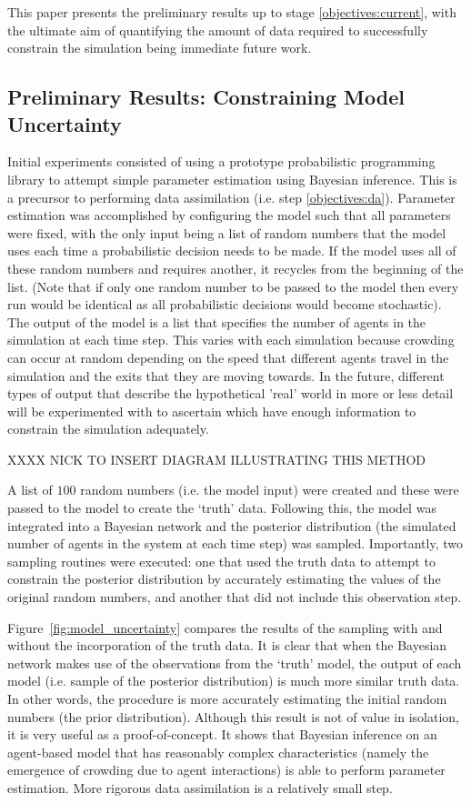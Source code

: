 \documentclass[runningheads]{llncs}
\begin{document}
This paper presents the preliminary results up to stage \ref{objectives:current}, with the ultimate aim of quantifying the amount of data required to successfully constrain the simulation being immediate future work. 


\subsection{Preliminary Results: Constraining Model Uncertainty}

Initial experiments consisted of using a prototype probabilistic programming library to attempt simple parameter estimation using Bayesian inference. This is a precursor to performing data assimilation (i.e. step \ref{objectives:da}). Parameter estimation was accomplished by configuring the model such that all parameters were fixed, with the only input being a list of random numbers that the model uses each time a probabilistic decision needs to be made. If the model uses all of these random numbers and requires another, it recycles from the beginning of the list. (Note that if only one random number to be passed to the model then every run would be identical as all probabilistic decisions would become stochastic). The output of the model is a list that specifies the number of agents in the simulation at each time step. This varies with each simulation because crowding can occur at random depending on the speed that different agents travel in the simulation and the exits that they are moving towards. In the future, different types of output that describe the hypothetical 'real' world in more or less detail will be experimented with to ascertain which have enough information to constrain the simulation adequately.

XXXX NICK TO INSERT DIAGRAM ILLUSTRATING THIS METHOD

A list of $100$ random numbers (i.e. the model input) were created and these were passed to the model to create the `truth' data. Following this, the model was integrated into a Bayesian network and the posterior distribution (the simulated number of agents in the system at each time step) was sampled. Importantly, two sampling routines were executed: one that used the truth data to attempt to constrain the posterior distribution by accurately estimating the values of the original random numbers, and another that did not include this observation step.

Figure~\ref{fig:model_uncertainty} compares the results of the sampling with and without the incorporation of the truth data. It is clear that when the Bayesian network makes use of the observations from the `truth' model, the output of each model (i.e. sample of the posterior distribution) is much more similar truth data. In other words, the procedure is more accurately estimating the initial random numbers (the prior distribution). Although this result is not of value in isolation, it is very useful as a proof-of-concept. It shows that Bayesian inference on an agent-based model that has reasonably complex characteristics (namely the emergence of crowding due to agent interactions) is able to perform parameter estimation. More rigorous data assimilation is a relatively small step.
\end{document}
